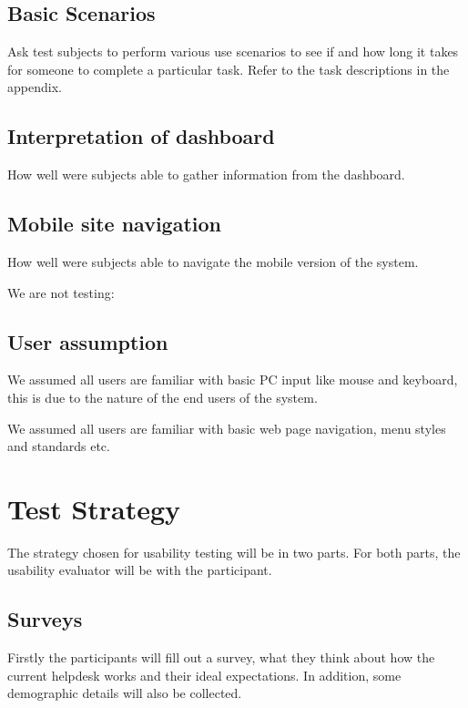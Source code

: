 \documentclass[12pt,a4paper,]{article}
\begin{document}
\subsection{Basic Scenarios}\label{basic-scenarios}

Ask test subjects to perform various use scenarios to see if and how
long it takes for someone to complete a particular task. Refer to the
task descriptions in the appendix.

\subsection{Interpretation of
dashboard}\label{interpretation-of-dashboard}

How well were subjects able to gather information from the dashboard.

\subsection{Mobile site navigation}\label{mobile-site-navigation}

How well were subjects able to navigate the mobile version of the
system.

We are not testing:

\subsection{User assumption}\label{user-assumption}

We assumed all users are familiar with basic PC input like mouse and
keyboard, this is due to the nature of the end users of the system.

We assumed all users are familiar with basic web page navigation, menu
styles and standards etc.

\section{Test Strategy}\label{test-strategy}

The strategy chosen for usability testing will be in two parts. For both
parts, the usability evaluator will be with the participant.

\subsection{Surveys}\label{surveys}

Firstly the participants will fill out a survey, what they think about
how the current helpdesk works and their ideal expectations. In
addition, some demographic details will also be collected.
\end{document}
